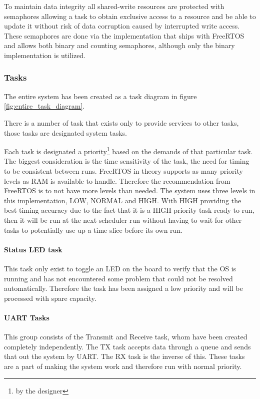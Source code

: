 \documentclass[../../../main]{subfiles}
\begin{document}
To maintain data integrity all shared-write resources are protected with semaphores allowing a task to obtain exclusive access to a resource and be able to update it without risk of data corruption caused by interrupted write access.
These semaphores are done via the implementation that ships with FreeRTOS and allows both binary and counting semaphores, although only the binary implementation is utilized.



\subsubsection{Tasks}

The entire system has been created as a task diagram in figure \ref{fig:entire_task_diagram}.

There is a number of task that exists only to provide services to other tasks, those tasks are designated system tasks.

Each task is designated a priority\footnote{by the designer} based on the demands of that particular task. The biggest consideration is the time sensitivity of the task, the need for timing to be consistent between runs. FreeRTOS in theory supports as many priority levels as RAM is available to handle. Therefore  the recommendation from FreeRTOS is to not have more levels than needed. The system uses three levels in this implementation, LOW, NORMAL and HIGH. With HIGH providing the best timing accuracy due to the fact that it is a HIGH priority task  ready to run, then it will be run at the next scheduler run without having to wait for other tasks to potentially use up a time slice before its own run.


\paragraph{Status LED task}

This task only exist to toggle an LED on the board to verify that the OS is running and has not encountered some problem that could not be resolved automatically. Therefore the task has been assigned a low priority and will be processed with spare capacity.

\paragraph{UART Tasks}%

This group consists of the Transmit and Receive task, whom have been created completely independently. The TX task accepts data through a queue and sends that out the system by UART. The RX task is the inverse of this. These tasks are a part of making the system work and therefore run with normal priority. 
\end{document}
